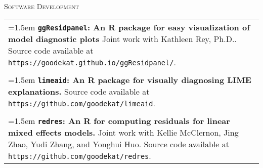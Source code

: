 \documentclass[10pt, oneside]{article}
\begin{document}
\noindent \textsc{Software Development} \hrulefill

\begin{longtable}{p{16.5cm}}
\hangindent=1.5em \textbf{\texttt{ggResidpanel}: An R package for easy visualization of model diagnostic plots} Joint work with Kathleen Rey, Ph.D.. Source code available at \texttt{https://goodekat.github.io/ggResidpanel/}.\\
\\
\hangindent=1.5em \textbf{\texttt{limeaid}: An R package for visually diagnosing LIME explanations.} Source code available at \texttt{https://github.com/goodekat/limeaid}.\\
\\
\hangindent=1.5em \textbf{\texttt{redres}: An R for computing residuals for linear mixed effects models.} Joint work with Kellie McClernon, Jing Zhao, Yudi Zhang, and Yonghui Huo. Source code available at \texttt{https://github.com/goodekat/redres}.
\end{longtable}
\end{document}
